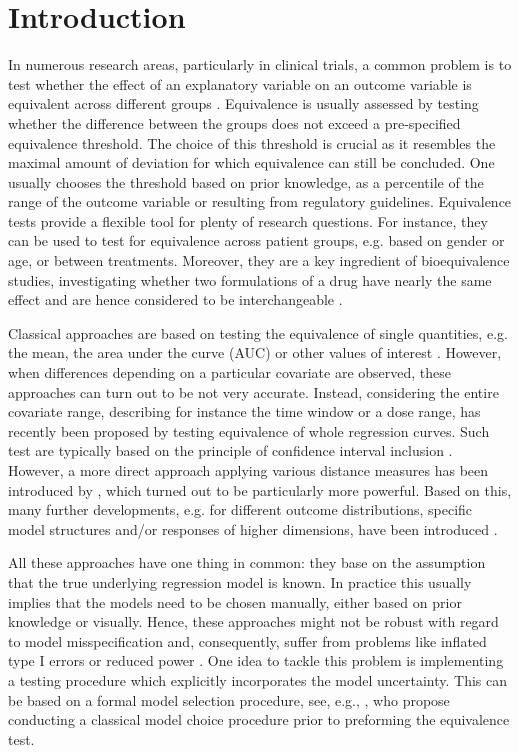 {\section{Introduction} \label{sec:intro}
In numerous research areas, particularly in clinical trials, a common problem is to test whether the effect of an explanatory variable on an outcome variable is equivalent across different groups \citep[see, e.g.,][]{Otto2008,Jhee2004}. 
Equivalence is usually assessed by testing whether the difference between the groups does not exceed a pre-specified equivalence threshold.
The choice of this threshold is crucial as it resembles the maximal amount of deviation for which equivalence can still be concluded. One usually chooses the threshold based on prior knowledge, as a percentile of the range of the outcome variable or resulting from regulatory guidelines.
Equivalence tests provide a flexible tool for plenty of research questions. For instance, they can be used to test for equivalence across patient groups, e.g. based on gender or age, or between treatments.
Moreover, they are a key ingredient of bioequivalence studies, investigating whether two formulations of a drug have nearly the same effect and are hence considered to be interchangeable \citep[e.g.][]{moellenhoff2022, Hauschke2007}. 

Classical approaches are based on testing the equivalence of single quantities, e.g. the mean, the area under the curve (AUC) or other values of interest \citep{Schuirmann1987, Lakens2017}. However, when differences depending on a particular covariate are observed, these approaches can turn out to be not very accurate. Instead, considering the entire covariate range, describing for instance the time window or a dose range, has recently been proposed by testing equivalence of whole regression curves. Such test are typically based on the principle of confidence interval inclusion \citep{Liu2009, Gsteiger2011, Bretz2018}. However, a more direct approach applying various distance measures has been introduced by \citet{Dette2018}, which turned out to be particularly more powerful. Based on this, many further developments, e.g. for different outcome distributions, specific model structures and/or responses of higher dimensions, have been introduced \citep[see, e.g.,][]{Moellenhoff2020, Moellenhoff2021, Moellenhoff2024, Hagemann2024}.

All these approaches have one thing in common: they base on the assumption that the true underlying regression model is known. In practice this usually implies that the models need to be chosen manually, either based on prior knowledge or visually. 
Hence, these approaches might not be robust with regard to model misspecification and, consequently, suffer from problems like inflated type I errors or reduced power \citep{Guhl2022, Dennis2019}.
One idea to tackle this problem is implementing a testing procedure which explicitly incorporates the model uncertainty. This can be based on a formal model selection procedure, see, e.g., \citet{Moellenhoff2018}, who propose conducting a classical model choice procedure prior to preforming the equivalence test. 

}
